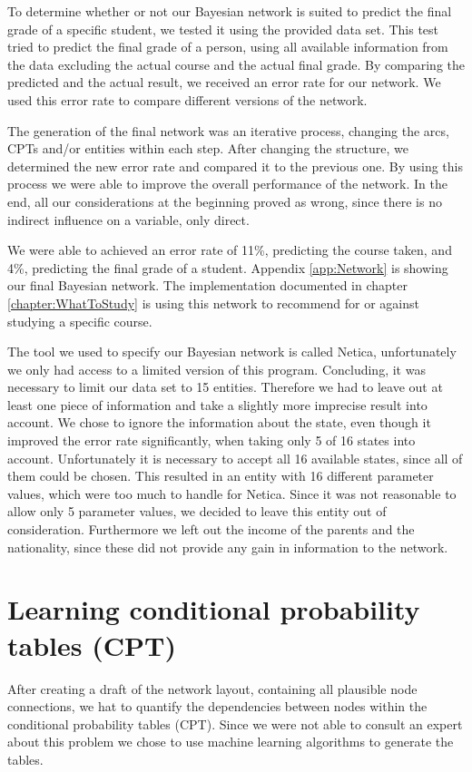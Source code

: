 \documentclass[%
	pdftex,
	oneside,        %
	11pt,           %
	parskip=half,   %
	headsepline,    %
	footsepline,    %
	abstracton,     %
	USenglish,      %
	a4paper,        %
]{report}
\begin{document}
To determine whether or not our Bayesian network is suited to predict the final grade of a specific student, we tested it using the provided data set. This test tried to predict the final grade of a person, using all available information from the data excluding the actual course and the actual final grade. By comparing the predicted and the actual result, we received an error rate for our network. We used this error rate to compare different versions of the network.

The generation of the final network was an iterative process, changing the arcs, CPTs and/or entities within each step. After changing the structure, we determined the new error rate and compared it to the previous one. By using this process we were able to improve the overall performance of the network. In the end, all our considerations at the beginning proved as wrong, since there is no indirect influence on a variable, only direct.

We were able to achieved an error rate of 11\%, predicting the course taken, and 4\%, predicting the final grade of a student. Appendix \vref{app:Network} is showing our final Bayesian network. The implementation documented in chapter \vref{chapter:WhatToStudy} is using this network to recommend for or against studying a specific course.

The tool we used to specify our Bayesian network is called Netica, unfortunately we only had access to a limited version of this program. Concluding, it was necessary to limit our data set to 15 entities. Therefore we had to leave out at least one piece of information and take a slightly more imprecise result into account. We chose to ignore the information about the state, even though it improved the error rate significantly, when taking only 5 of 16 states into account. Unfortunately it is necessary to accept all 16 available states, since all of them could be chosen. This resulted in an entity with 16 different parameter values, which were too much to handle for Netica. Since it was not reasonable to allow only 5 parameter values, we decided to leave this entity out of consideration. Furthermore we left out the income of the parents and the nationality, since these did not provide any gain in information to the network.

\chapter{Learning conditional probability tables (CPT)}
After creating a draft of the network layout, containing all plausible node connections, we hat to quantify the dependencies between nodes within the conditional probability tables (CPT). Since we were not able to consult an expert about this problem we chose to use machine learning algorithms to generate the tables.
\end{document}

